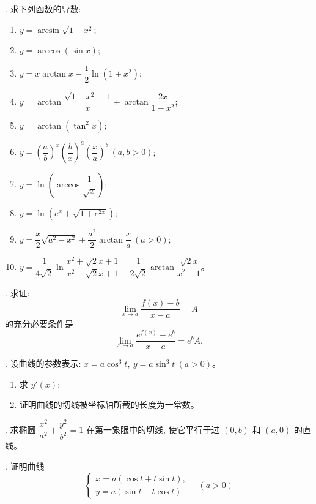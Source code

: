 \documentclass[UTF8,12pt,a4paper,fontset=fandol]{ctexart}
\begin{document}
. 求下列函数的导数:
\begin{enumerate}
  \item $y=\arcsin\sqrt{1-x^2}$;
  \item $y=\arccos(\sin x)$;
  \item $y=x\arctan x-\dfrac12\ln(1+x^2)$;
  \item $y=\arctan\dfrac{\sqrt{1-x^2}-1}{x}+\arctan\dfrac{2x}{1-x^2}$;
  \item $y=\arctan(\tan^2x)$;
  \item $y=\left(\dfrac ab\right)^x\left(\dfrac bx\right)^a\left(\dfrac xa\right)^b\ (a,b>0)$;
  \item $y=\ln\left(\arccos\dfrac1{\sqrt{x}}\right)$;
  \item $y=\ln(e^x+\sqrt{1+e^{2x}})$;
  \item $y=\dfrac x2\sqrt{a^2-x^2}+\dfrac{a^2}{2}\arctan\dfrac xa\ (a>0)$;
  \item $y=\dfrac1{4\sqrt2}\ln\dfrac{x^2+\sqrt2x+1}{x^2-\sqrt2x+1}-\dfrac1{2\sqrt2}\arctan\dfrac{\sqrt2x}{x^2-1}$。
\end{enumerate}

. 求证:
\[
  \lim_{x\to a}\frac{f(x)-b}{x-a}=A
\]
的充分必要条件是
\[
  \lim_{x\to a}\frac{e^{f(x)}-e^b}{x-a}=e^bA.
\]

. 设曲线的参数表示: $x=a\cos^3t,\ y=a\sin^3t\ (a>0)$。
\begin{enumerate}
  \item 求 $y'(x)$;
  \item 证明曲线的切线被坐标轴所截的长度为一常数。
\end{enumerate}

. 求椭圆 $\dfrac{x^2}{a^2}+\dfrac{y^2}{b^2}=1$ 在第一象限中的切线, 使它平行于过 $(0,b)$ 和 $(a,0)$ 的直线。

. 证明曲线
\[
  \begin{cases}
    x=a(\cos t+t\sin t),\\
    y=a(\sin t-t\cos t)
  \end{cases}
  \quad(a>0)
\]
\end{document}
